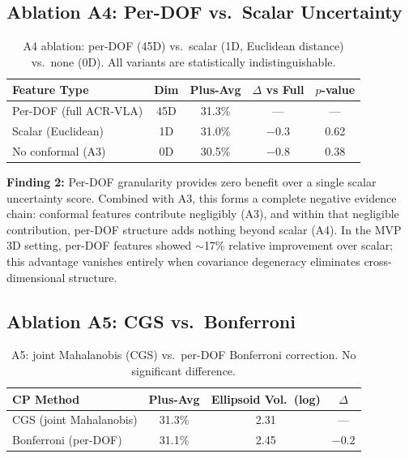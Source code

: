 \documentclass[letterpaper]{article}
\begin{document}
\subsection{Ablation A4: Per-DOF vs.\ Scalar Uncertainty}
\label{sec:exp-a4}

\begin{table}[h]
\centering
\caption{A4 ablation: per-DOF (45D) vs.\ scalar (1D, Euclidean distance) vs.\ none (0D). All variants are statistically indistinguishable.}
\label{tab:a4}
\begin{tabular}{lcccc}
\toprule
Feature Type & Dim & Plus-Avg & $\Delta$ vs Full & $p$-value \\
\midrule
Per-DOF (full ACR-VLA) & 45D & 31.3\% & --- & --- \\
Scalar (Euclidean) & 1D & 31.0\% & $-0.3$ & 0.62 \\
No conformal (A3) & 0D & 30.5\% & $-0.8$ & 0.38 \\
\bottomrule
\end{tabular}
\end{table}

\textbf{Finding 2:} Per-DOF granularity provides zero benefit over a single scalar uncertainty score. Combined with A3, this forms a complete negative evidence chain: conformal features contribute negligibly (A3), and within that negligible contribution, per-DOF structure adds nothing beyond scalar (A4). In the MVP 3D setting, per-DOF features showed $\sim$17\% relative improvement over scalar; this advantage vanishes entirely when covariance degeneracy eliminates cross-dimensional structure.

\subsection{Ablation A5: CGS vs.\ Bonferroni}
\label{sec:exp-a5}

\begin{table}[h]
\centering
\caption{A5: joint Mahalanobis (CGS) vs.\ per-DOF Bonferroni correction. No significant difference.}
\label{tab:a5}
\begin{tabular}{lccc}
\toprule
CP Method & Plus-Avg & Ellipsoid Vol.\ (log) & $\Delta$ \\
\midrule
CGS (joint Mahalanobis) & 31.3\% & 2.31 & --- \\
Bonferroni (per-DOF) & 31.1\% & 2.45 & $-0.2$ \\
\bottomrule
\end{tabular}
\end{table}
\end{document}
